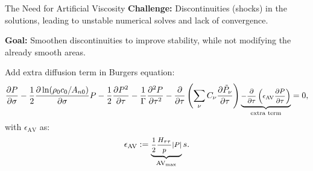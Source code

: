 \documentclass{beamer}
\newcounter{sectionframecount}
\begin{document}
\begin{frame}[t]{The Need for Artificial Viscosity}
\vspace{-10pt}
\textbf{Challenge:} Discontinuities (shocks) in the solutions, leading to unstable
numerical solves and lack of convergence.

{
\vspace{5pt}
\textbf{Goal:} Smoothen discontinuities to improve stability, while not modifying
the already smooth areas.
}


{
\vspace{10pt}
Add extra diffusion term in Burgers equation:
\vspace{-2pt}
\begin{equation}
  \footnotesize
  \dfrac{\partial P}{\partial \sigma}
  -\dfrac{1}{2}\dfrac{\partial \ln(\rho_0c_0/A_{n0})}{\partial \sigma}P
  -\dfrac{1}{2}\dfrac{\partial P^2}{\partial \tau}
  -\dfrac{1}{\Gamma}\dfrac{\partial ^2 P}{\partial \tau^2}
  -\dfrac{\partial }{\partial \tau}\left(\sum_{\nu} C_\nu \dfrac{\partial\tilde{P}_\nu}{\partial \tau}\right)
  \underbrace{- \dfrac{\partial}{\partial \tau} \left(\epsilon_{\text{AV}}\dfrac{\partial P}{\partial \tau}\right)}_{\text{extra term}}
  =0,
\end{equation}
with $\epsilon_{\text{AV}}$ as:
\vspace{-2pt}
\begin{equation}
  \footnotesize
  \epsilon_{\text{AV}} := \underbrace{\dfrac{1}{2}\dfrac{H_{\tau\tau}}{p}|P|}_{\text{AV}_{\text{max}}}s.
\end{equation}
}

\end{frame}

\end{document}
